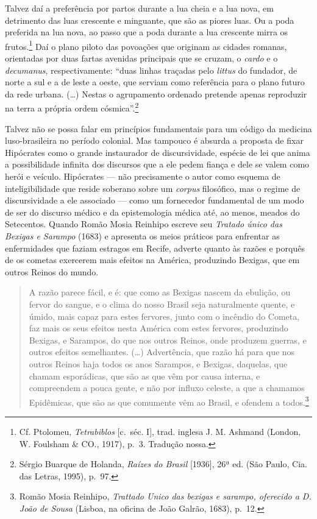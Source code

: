 Talvez daí a preferência por partos durante a lua cheia e a lua nova, em
detrimento das luas crescente e minguante, que são as piores luas. Ou a
poda preferida na lua nova, ao passo que a poda durante a lua crescente
mirra os frutos.\footnote{Cf. Ptolomeu, \textit{Tetrabiblos} {[}c.~séc.
  I{]}, trad. inglesa J. M. Ashmand (London, W. Foulsham \& CO., 1917),
  p.~3. Tradução nossa.} Daí o plano piloto das povoações que originam
as cidades romanas, orientadas por duas fartas avenidas principais que
se cruzam, o \textit{cardo} e o \textit{decumanus}, respectivamente: ``duas
linhas traçadas pelo \textit{littus} do fundador, de norte a sul e a de
leste a oeste, que serviam como referência para o plano futuro da rede
urbana. (\dots{}) Nestas o agrupamento ordenado pretende apenas reproduzir
na terra a própria ordem cósmica''.\footnote{Sérgio Buarque de Holanda,
  \textit{Raízes do Brasil} {[}1936{]}, 26ª ed. (São Paulo, Cia. das
  Letras, 1995), p.~97.}

Talvez não se possa falar em princípios fundamentais para um código da
medicina luso-brasileira no período colonial. Mas tampouco é absurda a
proposta de fixar Hipócrates como o grande instaurador de
discursividade, espécie de lei que anima a possibilidade infinita dos
discursos que a ele pedem fiança e dele se valem como herói e veículo.
Hipócrates --- não precisamente o autor como esquema de inteligibilidade
que reside soberano sobre um \textit{corpus} filosófico, mas o regime de
discursividade a ele associado --- como um fornecedor fundamental de um
modo de ser do discurso médico e da epistemologia médica até, ao menos,
meados do Setecentos. Quando Romão Mosia Reinhipo escreve seu
\textit{Tratado único das Bexigas e Sarampo} (1683) e apresenta os meios
práticos para enfrentar as enfermidades que faziam estragos em Recife,
adverte quanto às razões e porquês de os cometas exercerem mais efeitos
na América, produzindo Bexigas, que em outros Reinos do mundo.

\begin{quote}
A razão parece fácil, e é: que como as Bexigas nascem da ebulição, ou
fervor do sangue, e o clima do nosso Brasil seja naturalmente quente, e
úmido, mais capaz para estes fervores, junto com o incêndio do Cometa,
faz mais os seus efeitos nesta América com estes fervores, produzindo
Bexigas, e Sarampos, do que nos outros Reinos, onde produzem guerras, e
outros efeitos semelhantes. (\ldots{}) Advertência, que razão há para
que nos outros Reinos haja todos os anos Sarampos, e Bexigas, daquelas,
que chamam esporádicas, que são as que vêm por causa interna, e
compreendem a pouca gente, e não por influxo celeste, a que a chamamos
Epidêmicas, que são as que comumente vêm ao Brasil, e ofendem a
todos.\footnote{Romão Mosia Reinhipo, \textit{Trattado Unico das bexigas e
  sarampo, oferecido a D. João de Sousa} (Lisboa, na oficina de João
  Galrão, 1683), p.~12.}
\end{quote}


